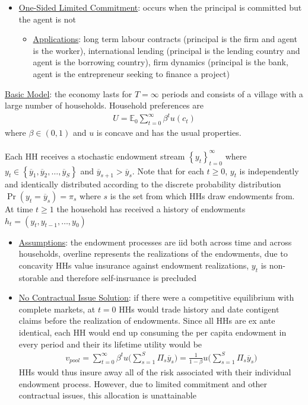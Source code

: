 \documentclass{article}
\begin{document}
\begin{itemize}
    \item  \underline{One-Sided Limited Commitment}: occurs when the principal is committed but the agent is not
    \begin{itemize}
        \item \underline{Applications}: long term labour contracts (principal is the firm and agent is the worker), international lending (principal is the lending country and agent is the borrowing country), firm dynamics (principal is the bank, agent is the entrepreneur seeking to finance a project)
    \end{itemize}
\end{itemize}
\vspace{2.5mm}
\par \underline{Basic Model}: the economy lasts for $T = \infty$ periods and consists of a village with a large number of households. Household preferences are
\begin{gather*}
    U = \mathbb{E}_{0} \sum_{t = 0}^{\infty} \beta^{t} u(c_{t})
\end{gather*}
where $\beta \in (0, 1)$ and $u$ is concave and has the usual properties. \\ \\ Each HH receives a stochastic endowment stream $\left\{y_{t}\right\}_{t=0}^{\infty}$ where $y_{t} \in \left\{ \overline{y}_{1}, \overline{y}_{2}, \dots, \overline{y}_{S} \right\}$ and $\overline{y}_{s+1} > \overline{y}_{s}$. Note that for each $t \geq 0$, $y_{t}$ is independently and identically distributed according to the discrete probability distribution $\Pr(y_{t} = \overline{y}_{s}) = \pi_{s}$ where $s$ is the set from which HHs draw endowments from. At time $t\geq 1$ the household has received a history of endowments $h_{t} = (y_{t}, y_{t-1}, \dots, y_{0})$
\begin{itemize}
    \item \underline{Assumptions}: the endowment processes are iid both across time and across households, overline represents the realizations of the endowments, due to concavity HHs value insurance against endowment realizations, $y_{t}$ is non-storable and therefore self-insruance is precluded
    \item \underline{No Contractual Issue Solution}: if there were a competitive equilibrium with complete markets, at $t=0$ HHs would trade history and date contigent claims before the realization of endowments. Since all HHs are ex ante identical, each HH would end up consuming the per capita endowment in every period and their its lifetime utility would be
    \begin{gather*}
        v_{pool} = \sum_{t=0}^{\infty} \beta^{t} u \Big( \sum_{s=1}^{S} \Pi_{s} \overline{y}_{s} \Big) = \frac{1}{1-\beta} u \Big( \sum_{s=1}^{S} \Pi_{s}\overline{y}_{s} \Big)
    \end{gather*}
    HHs would thus insure away all of the risk associated with their individual endowment process. However, due to limited commitment and other contractual issues, this allocation is unattainable
\end{itemize}
\end{document}

